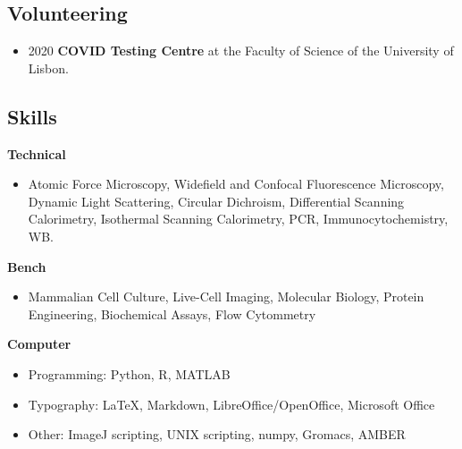 \documentclass[letterpaper,11pt]{article}
\begin{document}
\subsection*{Volunteering}
\begin{itemize}
\item 2020 \textbf{COVID Testing Centre} at the Faculty of Science of the University of Lisbon. %

\end{itemize}
\subsection*{Skills}
\normalsize{\textbf{Technical}}
\begin{itemize}
    \item Atomic Force Microscopy, Widefield and Confocal Fluorescence Microscopy, Dynamic Light Scattering, Circular Dichroism, Differential Scanning Calorimetry, Isothermal Scanning Calorimetry, PCR, Immunocytochemistry, WB.
\end{itemize}
\normalsize{\textbf{Bench}}
\begin{itemize}
    \item Mammalian Cell Culture, Live-Cell Imaging, Molecular Biology, Protein Engineering, Biochemical Assays, Flow Cytommetry
\end{itemize}
\normalsize{\textbf{Computer}}
\begin{itemize}
    \item Programming: Python, R, MATLAB
     \item Typography: \LaTeX, Markdown, LibreOffice/OpenOffice, Microsoft Office
    \item Other: ImageJ scripting, UNIX scripting, numpy, Gromacs, AMBER
\end{itemize}
\end{document}
